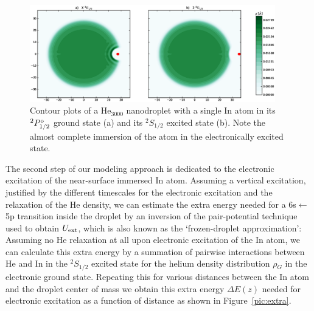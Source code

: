 \documentclass[twoside,twocolumn,9pt]{article}
\begin{document}
\begin{figure}[htbp!]
  	\begin{center}
 		\includegraphics[width=0.95\textwidth]{5.eps}
                \caption{Contour plots of a He$_3000$ nanodroplet with a single In atom in its $^2P^{\rm o}_{1/2}$ ground state (a) and its $^2S_{1/2}$ excited state (b). Note the almost complete immersion of the atom in the electronically excited state.\label{pic:cont}}
  	\end{center}
\end{figure}

The second step of our modeling approach is dedicated to the electronic excitation of the near-surface immersed In atom. Assuming a vertical excitation, justified by the different timescales for the electronic excitation and the relaxation of the He density, we can estimate the extra energy needed for a 6s$\leftarrow{}$5p transition inside the droplet by an inversion of the pair-potential technique used to obtain $U_{ \rm ext}$, which is also known as the `frozen-droplet approximation': Assuming no He relaxation at all upon electronic excitation of the In atom, we can calculate this extra energy by a summation of pairwise interactions between He and In in the $^2S_{1/2}$ excited state for the helium density distribution $\rho{}_G$ in the electronic ground state. Repeating this for various distances between the In atom and the droplet center of mass we obtain this extra energy $\Delta{}E(z)$ needed for electronic excitation as a function of distance as shown in Figure~\ref{pic:extra}.
\end{document}
